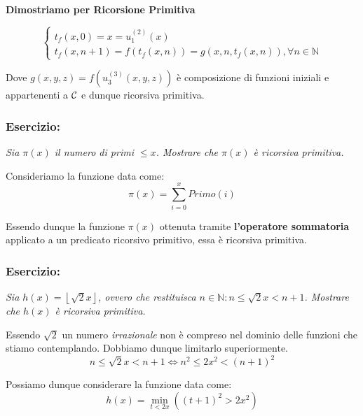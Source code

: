 \textbf{Dimostriamo per Ricorsione Primitiva}

\begin{equation}
    \begin{cases}
        t_f(x,0)=x=u_1^{(2)}(x)\\
        t_f(x,n+1)=f(t_f(x,n))=g(x,n,t_f(x,n)), \forall n \in \mathbb{N}
    \end{cases}
    \label{Funzione iterata n-esima di f Ricorsione Primitiva Eq}
\end{equation}

Dove \(g(x,y,z)=f(u_3^{(3)}(x,y,z))\) è composizione di funzioni iniziali e appartenenti a \(\mathcal{C}\) e dunque ricorsiva primitiva.

\subsubsection*{Esercizio:} \textit{Sia \(\pi(x)\) il numero di primi \(\leq x\). Mostrare che \(\pi(x)\) è ricorsiva primitiva.}

Consideriamo la funzione data come:
\begin{equation}
    \pi(x)=\sum_{i=0}^x Primo(i)
    \label{Funzione conta primi}
\end{equation}

Essendo dunque la funzione \(\pi(x)\) ottenuta tramite \textbf{l'operatore sommatoria} applicato a un predicato ricorsivo primitivo, essa è ricorsiva primitiva. %

\subsubsection*{Esercizio:} \textit{Sia \(h(x) =  \left\lfloor\sqrt{2}x\right\rfloor\), ovvero che restituisca \(n\in\mathbb{N}: n\leq\sqrt{2}x<n+1\). Mostrare che \(h(x)\) è ricorsiva primitiva.}

Essendo \(\sqrt{2}\) un numero \textit{irrazionale} non è compreso nel dominio delle funzioni che stiamo contemplando. Dobbiamo dunque limitarlo superiormente.
\begin{equation}
    n\leq\sqrt{2}x<n+1 \iff n^2\leq 2x^2<{(n+1)}^2
\end{equation}

Possiamo dunque considerare la funzione data come:
\begin{equation}
    h(x)=\min_{t<2x}({(t+1)}^2> 2x^2)
    \label{Funzione floor di sqrt2 x}
\end{equation}

